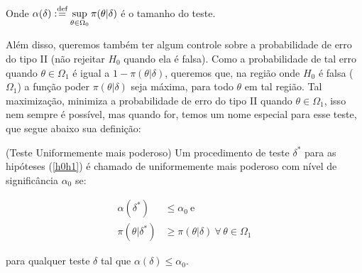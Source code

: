 \documentclass[a4paper,10pt, notitlepage]{report}
\newcommand{\defn}{\stackrel{\textrm{\scriptsize def}}{=}}
\begin{document}
	Onde $\displaystyle\alpha(\delta):\defn\sup_{\theta\in\Omega_0}\pi(\theta|\delta)$ é o tamanho do teste.
	
	
	
	Além disso, queremos também ter algum controle sobre a probabilidade de erro do tipo II (não rejeitar $H_0$ quando ela é falsa). Como a probabilidade de tal erro quando $\theta \in \Omega_1$ é igual a $1-\pi(\theta|\delta)$, queremos que, na região onde $H_0$ é falsa ($\Omega_1$) a função poder $\pi(\theta|\delta)$ seja máxima, para todo $\theta$ em tal região. Tal maximização, minimiza a probabilidade de erro do tipo II quando $\theta\in\Omega_1$, isso nem sempre é possível, mas quando for, temos um nome especial para esse teste, que segue abaixo sua definição:
	
	(Teste Uniformemente mais poderoso) Um procedimento de teste $\delta^*$ para as hipóteses (\ref{h0h1}) é chamado de uniformemente mais poderoso com nível de significância $\alpha_0$ se:
	
	\begin{align*}
	\alpha(\delta^*)&\leq \alpha_0~\text{e}\\\pi(\theta|\delta^*)&\geq\pi(\theta|\delta) ~\forall \,\theta \in \Omega_1
	\end{align*}
	
	para qualquer teste $\delta$ tal que $\alpha(\delta)\leq \alpha_0$.
	
	
	
	
\end{document}
